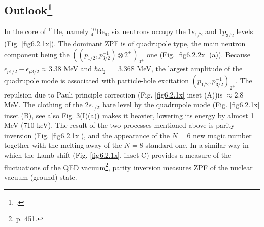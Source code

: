 \subsection[Outlook]{Outlook\footnote{\cite{Barranco:17}.}}
  In the core of $^{11}$Be, namely $^{10}_{4}$Be$_{6}$, six neutrons occupy the $1s_{1/2}$ and 1$p_{3/2}$ levels (Fig. \ref{fig6.2.1x}). The 
  dominant ZPF is of quadrupole type, the main neutron  component being  the 
  $((p_{1/2},p^{-1}_{3/2})\otimes 2^+)_{0^+}$ one (Fig. \ref{fig6.2.2x} (a)). Because $\epsilon_{p1/2} -
  \epsilon_{p3/2}\approx 3.38 $ MeV and $\hbar \omega_{2^+} =$3.368 MeV, the largest 
  amplitude of the quadrupole mode is associated with particle-hole excitation $(p_{1/2},p^{-1}_{3/2})_{2^+}$.
  The repulsion due to Pauli principle correction  (Fig. \ref{fig6.2.1x}  inset (A))is $\approx 2.8$ MeV.  
  The clothing of the $2s_{1/2}$ bare level by the quadrupole mode
  (Fig. \ref{fig6.2.1x} inset (B), see also Fig. 3(I)(a))  makes it  heavier, 
  lowering its energy by almost 1 MeV (710 keV). The result of the two processes mentioned above 
  is parity inversion 
  (Fig. \ref{fig6.2.1x}), and the  appearance of  the $N=6$ new magic number together with the melting 
  away of the $N=8$ standard one.
 In a similar way  in which the Lamb shift  (Fig. \ref{fig6.2.1x}, inset C)  provides a measure 
 of  the fluctuations of the QED vacuum\footnote{\cite{Pais:86} p. 451.},  parity inversion 
 measures ZPF of the nuclear vacuum (ground) state. 
